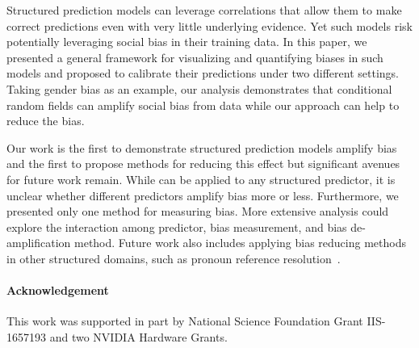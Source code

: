Structured prediction models can leverage correlations that allow them to make correct predictions even with very little underlying evidence.
Yet such models risk potentially leveraging social bias in their training data.
In this paper, we presented a general framework for visualizing and quantifying biases in such models and proposed \alg to calibrate their predictions under two different settings.
Taking gender bias as an example, our analysis demonstrates that conditional random fields can amplify social bias from data while our approach \alg{} can help to reduce the bias.

Our work is the first to demonstrate structured prediction models amplify bias and the first to propose methods for reducing this effect but significant avenues for future work remain.
While \alg{} can be applied to any structured predictor, it is unclear whether different predictors amplify bias more or less.
Furthermore, we presented only one method for measuring bias. 
More extensive analysis could explore the interaction among predictor, bias measurement, and bias de-amplification method. 
Future work also includes applying bias reducing methods in other structured domains, such as pronoun reference  resolution~\cite{mitkov2014anaphora}.


\paragraph{Acknowledgement}
This work was supported in part by National Science Foundation Grant IIS-1657193 and two NVIDIA Hardware Grants.